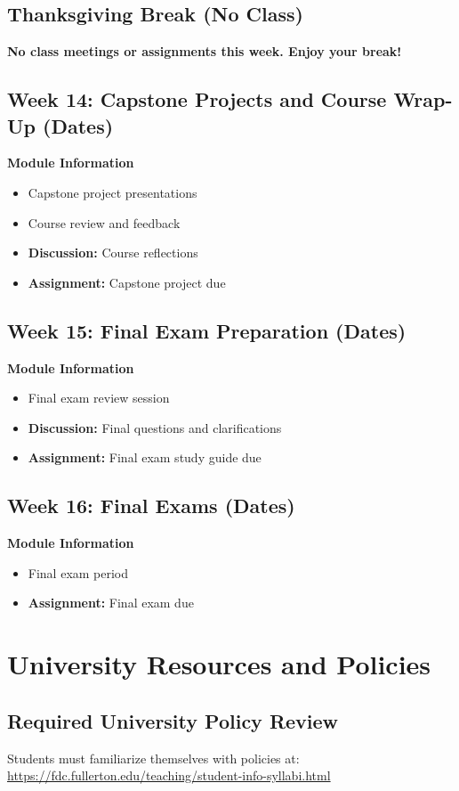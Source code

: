 \documentclass[12pt]{article}
\begin{document}
\subsection*{Thanksgiving Break (No Class)}
\textbf{No class meetings or assignments this week. Enjoy your break!}

\subsection*{Week 14: Capstone Projects and Course Wrap-Up (Dates)}
\textbf{Module Information}
\begin{itemize}
\item Capstone project presentations
\item Course review and feedback
\item \textbf{Discussion:} Course reflections
\item \textbf{Assignment:} Capstone project due
\end{itemize}

\subsection*{Week 15: Final Exam Preparation (Dates)}
\textbf{Module Information}
\begin{itemize}
\item Final exam review session
\item \textbf{Discussion:} Final questions and clarifications
\item \textbf{Assignment:} Final exam study guide due
\end{itemize}

\subsection*{Week 16: Final Exams (Dates)}
\textbf{Module Information}
\begin{itemize}
\item Final exam period
\item \textbf{Assignment:} Final exam due
\end{itemize}

\section*{University Resources and Policies}

\subsection*{Required University Policy Review}
Students must familiarize themselves with policies at: \\
\url{https://fdc.fullerton.edu/teaching/student-info-syllabi.html}
\end{document}

